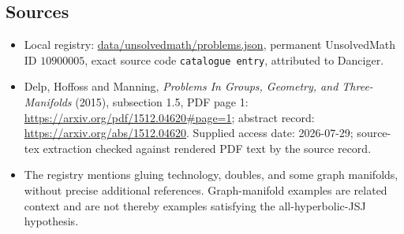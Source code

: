 \documentclass[11pt]{article}
\begin{document}
\subsection{Sources}
\begin{itemize}
\item Local registry: \url{data/unsolvedmath/problems.json}, permanent UnsolvedMath ID $10900005$, exact source code \texttt{catalogue entry}, attributed to Danciger.
\item Delp, Hoffoss and Manning, \emph{Problems In Groups, Geometry, and Three-Manifolds} (2015), subsection 1.5, PDF page 1: \url{https://arxiv.org/pdf/1512.04620#page=1}; abstract record: \url{https://arxiv.org/abs/1512.04620}. Supplied access date: 2026-07-29; source-tex extraction checked against rendered PDF text by the source record.
\item The registry mentions gluing technology, doubles, and some graph manifolds, without precise additional references. Graph-manifold examples are related context and are not thereby examples satisfying the all-hyperbolic-JSJ hypothesis.
\end{itemize}
\end{document}
